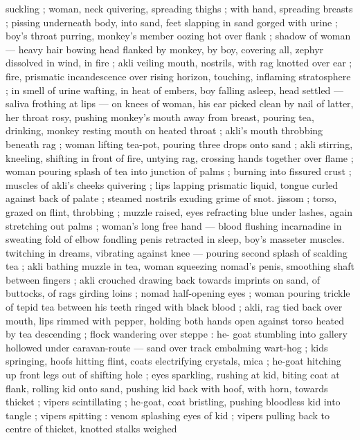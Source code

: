 suckling ; woman, neck quivering, spreading thighs ; with hand, 
spreading breasts ; pissing underneath body, into sand, feet 
slapping in sand gorged with urine ; boy's throat purring, monkey's 
member oozing hot over flank ; shadow of woman --- heavy hair 
bowing head {\dashcom} flanked by monkey, by boy, covering all, zephyr 
dissolved in wind, in fire ; akli veiling mouth, nostrils, with rag 
knotted over ear ; fire, prismatic incandescence over rising horizon, 
touching, inflaming stratosphere ; in smell of urine wafting, in heat 
of embers, boy falling asleep, head settled --- saliva frothing at lips 
--- on knees of woman, his ear picked clean by nail of latter, her 
throat rosy, pushing monkey's mouth away from breast, pouring tea, 
drinking, monkey resting mouth on heated throat ; akli's mouth 
throbbing beneath rag ; woman lifting tea-pot, pouring three drops 
onto sand ; akli stirring, kneeling, shifting in front of fire, untying 
rag, crossing hands together over flame ; woman pouring splash of 
tea into junction of palms ; burning into fissured crust ; muscles of 
akli's cheeks quivering ; lips lapping prismatic liquid, tongue curled 
against back of palate ; steamed nostrils exuding grime of snot. 
jissom ; torso, grazed on flint, throbbing ; muzzle raised, eyes 
refracting blue under lashes, again stretching out palms ; woman's 
long free hand --- blood flushing incarnadine in sweating fold of 
elbow fondling penis retracted in sleep, boy's masseter muscles. 
twitching in dreams, vibrating against knee --- pouring second splash 
of scalding tea ; akli bathing muzzle in tea, woman squeezing 
nomad's penis, smoothing shaft between fingers ; akli crouched 
drawing back towards imprints on sand, of buttocks, of rags girding 
loins ; nomad half-opening eyes ; woman pouring trickle of tepid tea 
between his teeth ringed with black blood ; akli, rag tied back over 
mouth, lips rimmed with pepper, holding both hands open against 
torso heated by tea descending ; flock wandering over steppe : he- 
goat stumbling into gallery hollowed under caravan-route --- sand 
over track embalming wart-hog ; kids springing, hoofs hitting flint, 
coats electrifying crystals, mica ; he-goat hitching up front legs out 
of shifting hole ; eyes sparkling, rushing at kid, biting coat at flank, 
rolling kid onto sand, pushing kid back with hoof, with horn, towards 
thicket ; vipers scintillating ; he-goat, coat bristling, pushing 
bloodless kid into tangle ; vipers spitting : venom splashing eyes of 
kid ; vipers pulling back to centre of thicket, knotted stalks weighed 
